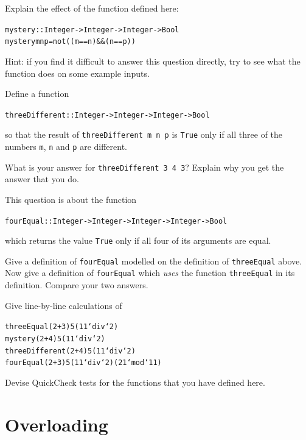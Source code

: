 \begin{exercises}
\vspace{-3pt}
\item
Explain the effect of the function defined here:
\begin{alltt}
mystery :: Integer -> Integer -> Integer -> Bool
mystery m n p = not ((m==n) \&\& (n==p))
\end{alltt}
Hint: if you find it difficult to answer this question directly, try to
see what the function does on some example inputs.

\item
Define a function 
\begin{alltt}
threeDifferent :: Integer -> Integer -> Integer -> Bool
\end{alltt}
so that the result of \texttt{threeDifferent m n p} is \texttt{True}
only if all three of the numbers \texttt{m}, \texttt{n} and \texttt{p}
are different.

What is your answer for \texttt{threeDifferent 3 4 3}? Explain why you
get the answer that you do.

\item
This question is about the function
\begin{alltt}
fourEqual :: Integer -> Integer -> Integer -> Integer -> Bool
\end{alltt}
which returns the value \texttt{True} only if all four of its arguments
are equal.

Give a definition of \texttt{fourEqual} modelled on the
definition of \texttt{threeEqual} above. Now give a definition of
\texttt{fourEqual} which {\em uses\/} the function \texttt{threeEqual}
in its definition. Compare your two answers.

\item
Give line-by-line calculations of
\begin{alltt}
threeEqual (2+3) 5 (11 `div` 2)
mystery (2+4) 5 (11 `div` 2)
threeDifferent (2+4) 5 (11 `div` 2)
fourEqual (2+3) 5 (11 `div` 2) (21 `mod` 11)
\end{alltt}

\item
Devise QuickCheck tests for the functions that you have defined here.



%
\end{exercises}
\vspace{-20pt}

\section{Overloading}
\label{overlIntro}
%
%

